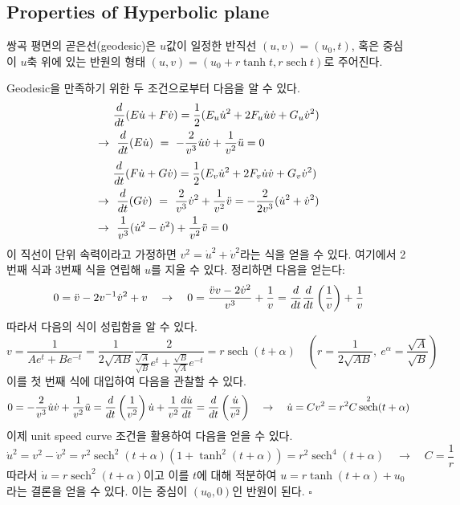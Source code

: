 \documentclass[10pt,a4paper]{article}
\DeclareMathOperator{\sech}{sech}
\renewenvironment{proof}{{\sffamily\bfseries Proof:~}}{\hfill$\square$}
\begin{document}
\subsection{Properties of Hyperbolic plane}
%
%
\begin{tcolorbox}[title=쌍곡 평면의 곧은선(Geodesic)]
쌍곡 평면의 곧은선(geodesic)은 $u$값이 일정한 반직선 $(u,v)=(u_0,t)$, 혹은 중심이 $u$축 위에 있는 반원의 형태 $(u,v)=(u_0+r\tanh{t},r\sech{t})$로 주어진다.
\end{tcolorbox}%
%
\begin{proof}
Geodesic을 만족하기 위한 두 조건으로부터 다음을 알 수 있다.
\begin{align*}
\null&\frac{d}{dt}(E\dot{u}+F\dot{v})=\frac{1}{2}(E_u\dot{u}^2+2F_u\dot{u}\dot{v}+G_u\dot{v}^2)\\
\to~&~%
\frac{d}{dt}(E\dot{u})~=~-\frac{2}{v^3}\dot{u}\dot{v}+\frac{1}{v^2}\Ddot{u}=0
\end{align*}%
\begin{align*}
\null&\frac{d}{dt}(F\dot{u}+G\dot{v})=\frac{1}{2}(E_v\dot{u}^2+2F_v\dot{u}\dot{v}+G_v\dot{v}^2)\\
\to~&~%
\frac{d}{dt}(G\dot{v})~=~\frac{2}{v^3}\dot{v}^2+\frac{1}{v^2}\Ddot{v}=-\frac{2}{2v^3}(\dot{u}^2+\dot{v}^2)\\
\to~&~%
\frac{1}{v^3}(\dot{u}^2-\dot{v}^2)+\frac{1}{v^2}\Ddot{v}=0
\end{align*}
이 직선이 단위 속력이라고 가정하면 $v^2=\dot{u}^2+\dot{v}^2$라는 식을 얻을 수 있다. 여기에서 2번째 식과 3번째 식을 연립해 $u$를 지울 수 있다. 정리하면 다음을 얻는다:
\[
0=\Ddot{v}-2v^{-1}\dot{v}^2+v\quad\to\quad 0=\frac{\Ddot{v}v-2\dot{v}^2}{v^3}+\frac{1}{v}=\frac{d}{dt}\frac{d}{dt}\left(\frac{1}{v}\right)+\frac{1}{v}
\]
따라서 다음의 식이 성립함을 알 수 있다.\[
\displaystyle v=\frac{1}{Ae^{t}+Be^{-t}}=\frac{1}{2\sqrt{AB}}\frac{2}{\frac{\sqrt{A}}{\sqrt{B}}e^{t}+\frac{\sqrt{B}}{\sqrt{A}}e^{-t}}=r\sech(t+\alpha)\quad(r=\frac{1}{2\sqrt{AB}},~e^\alpha=\frac{\sqrt{A}}{\sqrt{B}})
\]%
이를 첫 번째 식에 대입하여 다음을 관찰할 수 있다.\[
0=-\frac{2}{v^3}\dot{u}\dot{v}+\frac{1}{v^2}\Ddot{u}=\frac{d}{dt}\left(\frac{1}{v^2}\right)\dot{u}+\frac{1}{v^2}\frac{d\dot{u}}{dt}=\frac{d}{dt}\left(\frac{\dot{u}}{v^2}\right)\quad\to\quad\dot{u}=Cv^2=r^2C\sech^2(t+\alpha)
\]
이제 unit speed curve 조건을 활용하여 다음을 얻을 수 있다. \[\dot{u}^2=v^2-\dot{v}^2=r^2\sech^2(t+\alpha)(1+\tanh^2(t+\alpha))=r^2\sech^4(t+\alpha)\quad\to\quad C=\frac{1}{r}\]
따라서 $\dot{u}=r\sech^2(t+\alpha)$이고 이를 $t$에 대해 적분하여 $u=r\tanh(t+\alpha)+u_0$라는 결론을 얻을 수 있다. 이는 중심이 $(u_0,0)$인 반원이 된다.
\end{proof}\\[1em]
\end{document}
